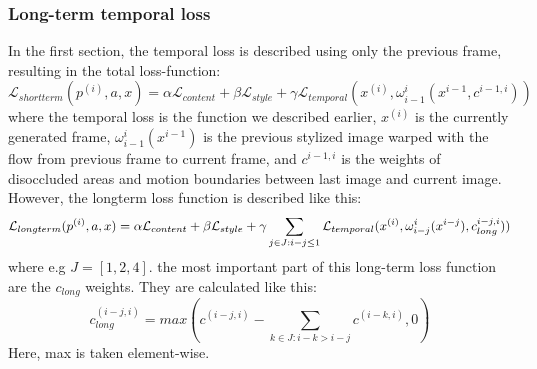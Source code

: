 \subsubsection{Long-term temporal loss}
\label{sec:long_term_temporal_loss}
In the first section, the temporal loss is described using only the previous frame, resulting in the total loss-function: 
\begin{equation}
\mathcal{L}_{shortterm}(p^{(i)}, a, x) = \alpha \mathcal{L}_{content} + \beta \mathcal{L}_{style} + \gamma \mathcal{L}_{temporal}(x^{(i)}, \omega_{i-1}^i(x^{i-1}, c^{i-1, i}))
\end{equation}
where the temporal loss is the function we described earlier, $x^{(i)}$ is the currently generated frame,  $\omega_{i-1}^i(x^{i-1})$ is the previous stylized image warped with the flow from previous frame to current frame, and $c^{i-1, i}$ is the weights of disoccluded areas and motion boundaries between last image and current image. However, the longterm loss function is described like this: \newline
\begin{equation}
\mathcal{L}_{longterm}(p^{(i)}, a, x) = \alpha \mathcal{L}_{content} + \beta \\\mathcal{L}_{style} + \gamma \sum_{j\in J: i-j \leq 1}\mathcal{L}_{temporal}(x^{(i)}, \omega_{i-j}^i(x^{i-j}), c_{long}^{i-j, i}))
\end{equation}
where e.g $J = [1, 2, 4]$. the most important part of this long-term loss function are the $c_{long}$ weights. They are calculated like this:\newline
\begin{equation}
c_{long}^{(i-j, i)} = max(c^{(i-j, i)} - \sum_{k\in J: i - k > i - j} c^{(i-k, i)}, 0)
\end{equation}
Here, max is taken element-wise.\newline
